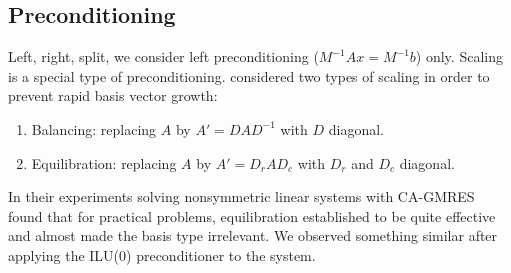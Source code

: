 \documentclass{scrartcl}
\newcommand{\norm}[1]{\left\lVert#1\right\rVert}
\begin{document}
\begin{algorithm}[H]
\end{algorithm}

\subsection{Preconditioning}
Left, right, split, we consider left preconditioning ($M^{-1}Ax = M^{-1}b$) only.
Scaling is a special type of preconditioning. \cite{Hoemmen:2010:CKS:1970638} considered two types of scaling in order to prevent rapid basis vector growth:
\begin{enumerate}
\item Balancing: replacing $A$ by $A' = DAD^{-1}$ with $D$ diagonal.
\item Equilibration: replacing $A$ by $A' = D_rAD_c$ with $D_r$ and $D_c$ diagonal.
\end{enumerate}
In their experiments solving nonsymmetric linear systems with CA-GMRES \cite{Hoemmen:2010:CKS:1970638} found that for practical problems, equilibration established to be quite effective and almost made the basis type irrelevant. We observed something similar after applying the ILU(0) preconditioner to the system.
\end{document}
